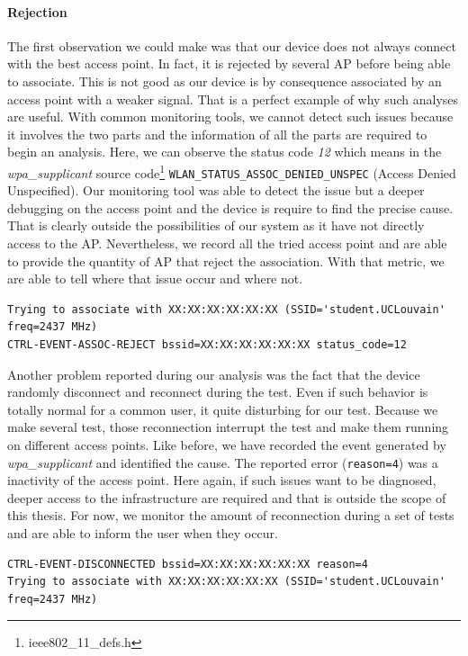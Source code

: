 \paragraph*{Rejection} The first observation we could make was that our device does not always connect with the best access point. In fact, it is rejected by several AP before being able to associate. This is not good as our device is by consequence associated by an access point with a weaker signal. That is a perfect example of why such analyses are useful. With common monitoring tools, we cannot detect such issues because it involves the two parts and the information of all the parts are required to begin an analysis. Here, we can observe the status code \emph{12} which means in the \emph{wpa_supplicant} source code\footnote{ieee802_11_defs.h} \texttt{WLAN_STATUS_ASSOC_DENIED_UNSPEC} (Access Denied Unspecified). Our monitoring tool was able to detect the issue but a deeper debugging on the access point and the device is require to find the precise cause. That is clearly outside the possibilities of our system as it have not directly access to the AP. Nevertheless, we record all the tried access point and are able to provide the quantity of AP that reject the association. With that metric, we are able to tell where that issue occur and where not.

\begin{lstlisting}[frame=single,breaklines=true,caption={Exemple of rejection}]
Trying to associate with XX:XX:XX:XX:XX:XX (SSID='student.UCLouvain' freq=2437 MHz)
CTRL-EVENT-ASSOC-REJECT bssid=XX:XX:XX:XX:XX:XX status_code=12
\end{lstlisting}

 Another problem reported during our analysis was the fact that the device randomly disconnect and reconnect during the test. Even if such behavior is totally normal for a common user, it quite disturbing for our test. Because we make several test, those reconnection interrupt the test and make them running on different access points. Like before, we have recorded the event generated by \emph{wpa_supplicant} and identified the cause. The reported error (\texttt{reason=4}) was a inactivity of the access point. Here again, if such issues want to be diagnosed, deeper access to the infrastructure are required and that is outside the scope of this thesis. For now, we monitor the amount of reconnection during a set of tests and are able to inform the user when they occur.

\begin{lstlisting}[frame=single,breaklines=true,caption={Example of Deconnection trace}]
CTRL-EVENT-DISCONNECTED bssid=XX:XX:XX:XX:XX:XX reason=4
Trying to associate with XX:XX:XX:XX:XX:XX (SSID='student.UCLouvain' freq=2437 MHz)
\end{lstlisting}

